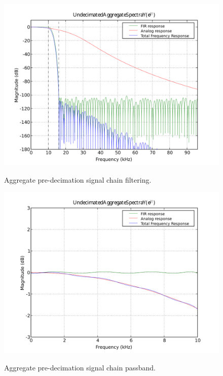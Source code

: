 \begin{figure}[h!]
  \includegraphics[scale=0.7]{soma-1.digital.aggregate.svg}
  \label{digital.aggregate}
  \caption{Aggregate pre-decimation signal chain filtering.}
  \includegraphics[scale=0.7]{soma-1.digital.pass.svg}
  \label{digital.pass}
  \caption{Aggregate pre-decimation signal chain passband.}
\end{figure}


